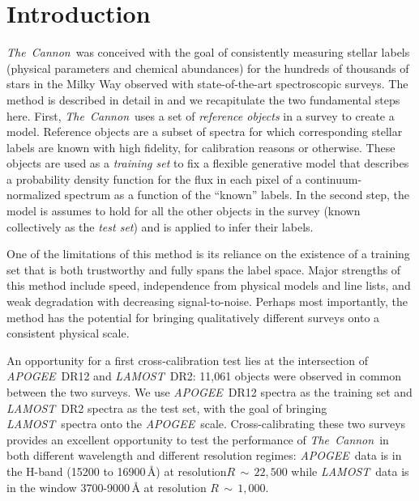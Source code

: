 \documentclass[12pt, preprint]{aastex}
\newcommand{\tc}{\textsl{The~Cannon}}
\newcommand{\apogee}{\textsl{APOGEE}}
\newcommand{\lamost}{\textsl{LAMOST}}
\begin{document}

\section{Introduction}

\tc\ was conceived with the goal of consistently measuring stellar labels 
(physical parameters and chemical abundances) for the hundreds of thousands of 
stars in the Milky Way observed with state-of-the-art spectroscopic surveys. 
The method is described in detail in \citep{ness2015} and we recapitulate the 
two fundamental steps here. First, \tc\ uses a set of \emph{reference objects}
in a survey to create a model. Reference objects are a subset of spectra for
which corresponding stellar labels are known with high fidelity, for
calibration reasons or otherwise. These objects are used as a
\emph{training set} to fix a flexible generative model that describes 
a probability density function for the flux in each pixel of a 
continuum-normalized spectrum as a function of the ``known'' labels.
In the second step, the model is assumes to hold for all the 
other objects in the survey (known collectively as the \emph{test set}) and 
is applied to infer their labels. 

One of the limitations of this method is its reliance on the existence of a 
training set that is both trustworthy and fully spans the label space.
Major strengths of this method include speed, independence from physical 
models and line lists, and weak degradation with decreasing signal-to-noise. 
Perhaps most importantly, the method has the potential for bringing 
qualitatively different surveys onto a consistent physical scale.

An opportunity for a first cross-calibration test lies at the intersection
of \apogee\ DR12 and \lamost\ DR2: 11,061 objects were observed in common
between the two surveys. We use \apogee\ DR12 spectra as the 
training set and \lamost\ DR2 spectra as the test set, 
with the goal of bringing \lamost\ spectra onto the \apogee\ scale. 
Cross-calibrating these two surveys provides an excellent opportunity to test
the performance of \tc\ in both different wavelength and different resolution
regimes: \apogee\ data is in the H-band (15200 to 16900\,$\mbox{\AA}$) at 
resolution$R\,\sim\,22,500$ while \lamost\ data is in the window 
3700-9000\,$\mbox{\AA}$ at resolution $R\,\sim\,1,000$. 
\end{document}
